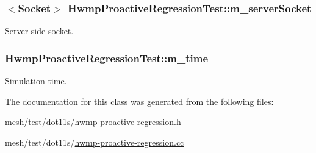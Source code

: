 \subsubsection[{\texorpdfstring{m\+\_\+server\+Socket}{m_serverSocket}}]{$<${\bf Socket}$>$ Hwmp\+Proactive\+Regression\+Test\+::m\+\_\+server\+Socket\hspace{0.3cm}{\ttfamily [private]}}\hypertarget{classHwmpProactiveRegressionTest_ae25abe12f56c0fef338b484d16963115}{}\label{classHwmpProactiveRegressionTest_ae25abe12f56c0fef338b484d16963115}


Server-\/side socket. 

\subsubsection[{\texorpdfstring{m\+\_\+time}{m_time}}]{ Hwmp\+Proactive\+Regression\+Test\+::m\+\_\+time\hspace{0.3cm}{\ttfamily [private]}}\hypertarget{classHwmpProactiveRegressionTest_a3763ac5b8a1a360d2389fad7d0049965}{}\label{classHwmpProactiveRegressionTest_a3763ac5b8a1a360d2389fad7d0049965}


Simulation time. 



The documentation for this class was generated from the following files\+:\begin{DoxyCompactItemize}
\item 
mesh/test/dot11s/\hyperlink{hwmp-proactive-regression_8h}{hwmp-\/proactive-\/regression.\+h}\item 
mesh/test/dot11s/\hyperlink{hwmp-proactive-regression_8cc}{hwmp-\/proactive-\/regression.\+cc}\end{DoxyCompactItemize}
